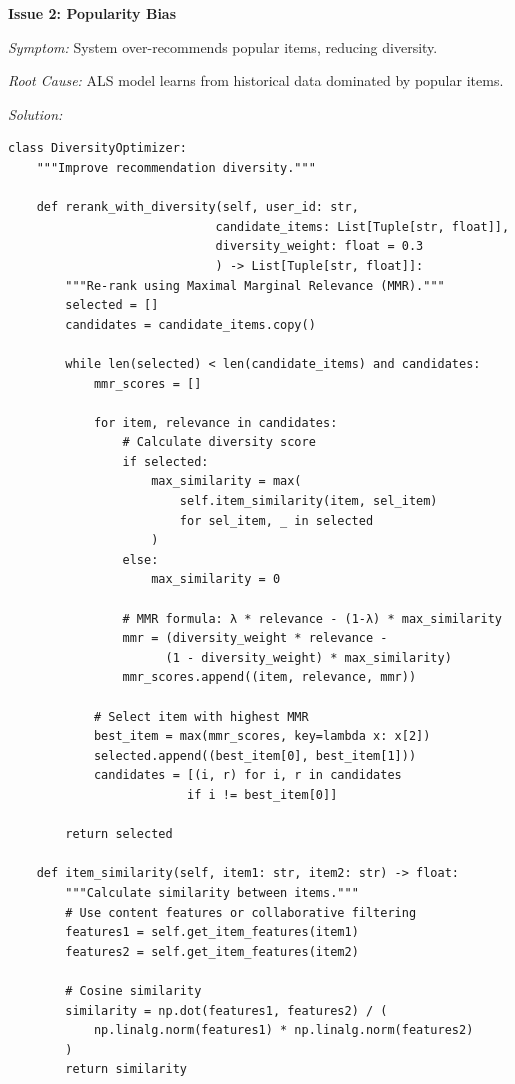 \textbf{Issue 2: Popularity Bias}

\textit{Symptom:} System over-recommends popular items, reducing diversity.

\textit{Root Cause:} ALS model learns from historical data dominated by popular items.

\textit{Solution:}
\begin{lstlisting}[style=python]
class DiversityOptimizer:
    """Improve recommendation diversity."""

    def rerank_with_diversity(self, user_id: str,
                             candidate_items: List[Tuple[str, float]],
                             diversity_weight: float = 0.3
                             ) -> List[Tuple[str, float]]:
        """Re-rank using Maximal Marginal Relevance (MMR)."""
        selected = []
        candidates = candidate_items.copy()

        while len(selected) < len(candidate_items) and candidates:
            mmr_scores = []

            for item, relevance in candidates:
                # Calculate diversity score
                if selected:
                    max_similarity = max(
                        self.item_similarity(item, sel_item)
                        for sel_item, _ in selected
                    )
                else:
                    max_similarity = 0

                # MMR formula: λ * relevance - (1-λ) * max_similarity
                mmr = (diversity_weight * relevance -
                      (1 - diversity_weight) * max_similarity)
                mmr_scores.append((item, relevance, mmr))

            # Select item with highest MMR
            best_item = max(mmr_scores, key=lambda x: x[2])
            selected.append((best_item[0], best_item[1]))
            candidates = [(i, r) for i, r in candidates
                         if i != best_item[0]]

        return selected

    def item_similarity(self, item1: str, item2: str) -> float:
        """Calculate similarity between items."""
        # Use content features or collaborative filtering
        features1 = self.get_item_features(item1)
        features2 = self.get_item_features(item2)

        # Cosine similarity
        similarity = np.dot(features1, features2) / (
            np.linalg.norm(features1) * np.linalg.norm(features2)
        )
        return similarity
\end{lstlisting}

